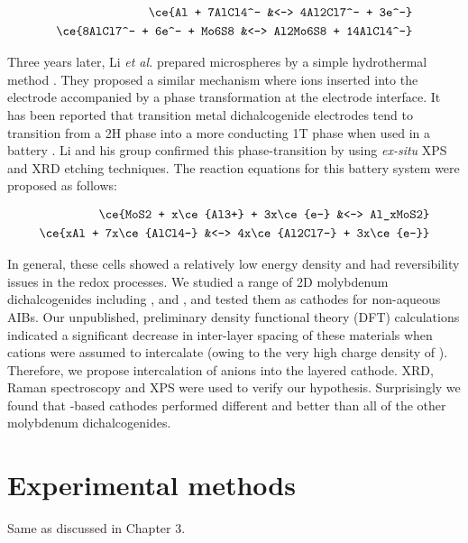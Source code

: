 \begin{align*}
          \ce{Al + 7AlCl4^- &<-> 4Al2Cl7^- + 3e^-}\\
\ce{8AlCl7^- + 6e^- + Mo6S8 &<-> Al2Mo6S8 + 14AlCl4^-}
\end{align*}

Three years later, Li \textit{et al.} prepared  microspheres by a simple hydrothermal method \cite{li_rechargeable_2018-2}. They proposed a similar mechanism where  ions inserted into the electrode accompanied by a phase transformation at the electrode interface. It has been reported that transition metal dichalcogenide electrodes tend to transition from a 2H phase into a more conducting 1T phase when used in a battery \cite{fan_hybrid_2017}. Li and his group confirmed this phase-transition by using \textit{ex-situ} XPS and XRD etching techniques. The reaction equations for this battery system were proposed as follows:

\begin{align*}
    \ce{MoS2 + x\ce{Al3+}  + 3x\ce{e-} &<-> Al_xMoS2}\\
    \ce{xAl + 7x\ce{AlCl4-} &<-> 4x\ce{Al2Cl7-} + 3x\ce{e-}}
\end{align*}

In general, these cells showed a relatively low energy density and had reversibility issues in the redox processes. We studied a range of 2D molybdenum dichalcogenides including ,  and , and tested them as cathodes for non-aqueous AIBs. Our unpublished, preliminary density functional theory (DFT) calculations indicated a significant decrease in inter-layer spacing of these materials when  cations were assumed to intercalate (owing to the very high charge density of ). Therefore, we propose intercalation of  anions into the layered cathode. XRD, Raman spectroscopy and XPS were used to verify our hypothesis. Surprisingly we found that -based cathodes performed different and better than all of the other molybdenum dichalcogenides.

\section{Experimental methods}
Same as discussed in Chapter 3.

